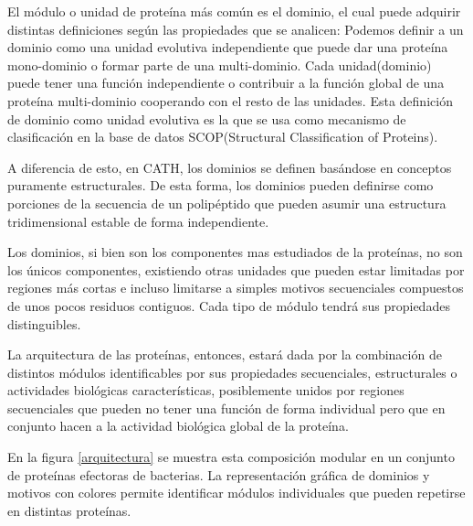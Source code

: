 El módulo o unidad de proteína más común es el dominio, el cual puede adquirir distintas definiciones según las propiedades que se analicen:
Podemos definir a un dominio como una unidad evolutiva independiente que puede dar una proteína mono-dominio o formar parte de una multi-dominio. 
Cada unidad(dominio) puede tener una función independiente o contribuir a la función global de una proteína multi-dominio cooperando con el resto de las unidades.
Esta definición de dominio como unidad evolutiva es la que se usa como mecanismo de clasificación en la base de datos SCOP(Structural Classification of Proteins)\cite{murzin1995scop}. 

A diferencia de esto, en CATH\cite{orengo1997cath}, los dominios se definen basándose en conceptos puramente estructurales. 
De esta forma, los dominios pueden definirse como porciones de la secuencia de un polipéptido que pueden asumir una estructura tridimensional estable de forma independiente. 

Los dominios, si bien son los componentes mas estudiados de la proteínas, no son los únicos componentes, existiendo otras unidades que pueden estar 
limitadas por regiones más cortas e incluso limitarse a simples motivos secuenciales compuestos de unos pocos residuos contiguos.
Cada tipo de módulo tendrá sus propiedades distinguibles.

La arquitectura de las proteínas, entonces, estará dada por la combinación de distintos módulos identificables por sus propiedades secuenciales, estructurales o actividades biológicas características, 
posiblemente unidos por regiones secuenciales que pueden no tener una función de forma individual pero que en conjunto hacen a la actividad biológica global de la proteína.

En la figura \ref{arquitectura} se muestra esta composición modular en un conjunto de proteínas efectoras de bacterias.
La representación gráfica de dominios y motivos con colores permite identificar módulos individuales que pueden repetirse en distintas proteínas.

